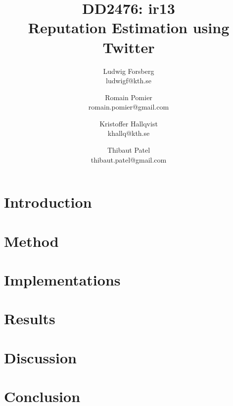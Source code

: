 \documentclass[a4paper,11pt]{report}
\title{\TitleFontTwo DD2476: ir13 \\ \TitleFont Reputation Estimation using Twitter}
\author{Ludwig Forsberg \\ ludwigf@kth.se \and Romain Pomier \\  romain.pomier@gmail.com \and Kristoffer Hallqvist \\ khallq@kth.se \and Thibaut Patel \\ thibaut.patel@gmail.com}
\begin{document}
\maketitle
\clearpage

\abstract{
}

\tableofcontents

\clearpage
\chapter{Introduction}

\chapter{Method}

\chapter{Implementations}

\chapter{Results}

\chapter{Discussion}

\chapter{Conclusion}
\end{document}
